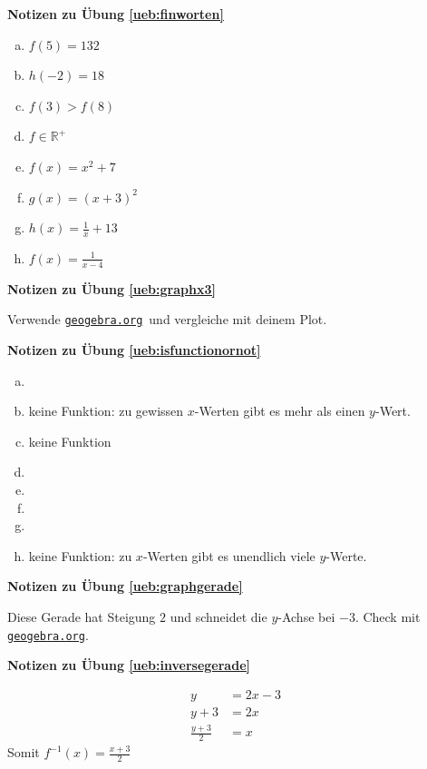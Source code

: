 \documentclass[%
<<<<<<< Updated upstream
11pt,%
twoside,%
titlepage,%
german,%
=======
11pt,%
twoside,%
titlepage,%
swissgerman,%
>>>>>>> Stashed changes
headsepline%
]{scrartcl}
\newcommand{\geogebralink}{\href{https://www.geogebra.org/calculator}{\texttt{geogebra.org}}}
\newcommand{\faReturnGray}{\textcolor{gray}{\faMailReply}} %
\newcommand{\geogebralink}{\href{https://www.geogebra.org/calculator}{\texttt{geogebra.org}}}
\theoremstyle{definition}
\theoremstyle{plain}
\newcommand{\concatueb}[1]{ueb:#1}%
\newcommand{\concatlsg}[1]{lsg:#1}%
\newenvironment{lsg}[1]{%
    \par\noindent\textbf{Notizen zu Übung \ref{\concatueb{#1}}}\label{\concatlsg{#1}}
    \hfill\hyperref[\concatueb{#1}]{\faReturnGray}\par %
}{%
    \par%
}
\newcommand{\concatueb}[1]{ueb:#1}%
\newcommand{\concatlsg}[1]{lsg:#1}%
\newenvironment{lsg}[1]{%
    \par\noindent\textbf{Notizen zu Übung \ref{\concatueb{#1}}.}%
    \label{\concatlsg{#1}}
}{%
    \par%
}
\begin{document}
\begin{lsg}{finworten}
	\begin{enumerate}[a)]
		\item $f(5)=132$
		\item $h(-2)=18$
		\item $f(3)>f(8)$
		\item $f\in\mathbb{R}^{+}$
		\item $f(x)=x^{2}+7$
		\item $g(x)=(x+3)^{2}$
		\item $h(x)=\frac{1}{x}+13$
		\item $f(x)=\frac{1}{x-4}$
	\end{enumerate}
\end{lsg}
\begin{lsg}{graphx3}
	Verwende \geogebralink\   und vergleiche mit deinem Plot.
\end{lsg}
\begin{lsg}{isfunctionornot}
  \begin{enumerate}[a)]
    \item \checkmark
    \item keine Funktion: zu gewissen $x$-Werten gibt es mehr als einen $y$-Wert.
    \item keine Funktion
    \item \checkmark
    \item \checkmark
    \item \checkmark
    \item \checkmark
    \item keine Funktion: zu $x$-Werten gibt es unendlich viele $y$-Werte.
  \end{enumerate}
\end{lsg}

\begin{lsg}{graphgerade}
	Diese Gerade hat Steigung $2$ und schneidet die $y$-Achse bei $-3$. Check mit \geogebralink.
\end{lsg}

\begin{lsg}{inversegerade}
	\begin{align*}
	y &= 2x-3\tag{$+3$}\\
	y+3 &= 2x\tag{$\div2$}\\
	\frac{y+3}{2} &= x
	\end{align*}
Somit $f^{-1}(x)=\frac{x+3}{2}$
\end{lsg}
\end{document}
